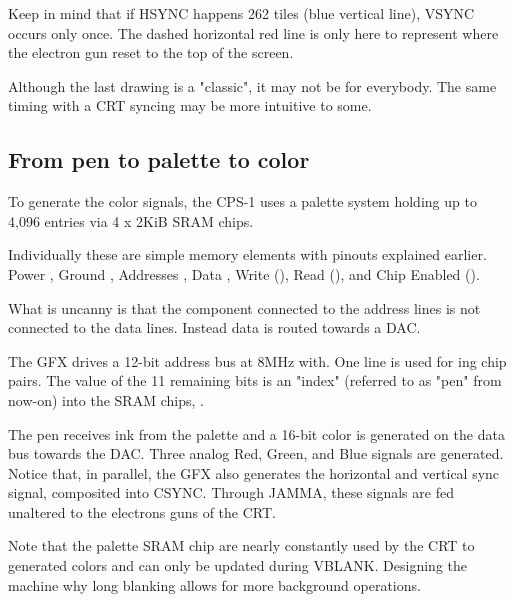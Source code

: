 
Keep in mind that if HSYNC happens 262 tiles (blue vertical line), VSYNC occurs only once. The dashed horizontal red line is only here to represent where the electron gun reset to the top of the screen.

Although the last drawing is a "classic", it may not be for everybody. The same timing with a CRT syncing may be more intuitive to some.


\subsection{From pen to palette to color}

To generate the color signals, the CPS-1 uses a palette system holding up to 4,096 entries via 4 x 2KiB  SRAM chips.


Individually these are simple memory elements with pinouts explained earlier. Power , Ground , Addresses , Data , Write (), Read (), and Chip Enabled ().

What is uncanny is that the component connected to the address lines is not connected to the data lines. Instead data is routed towards a DAC.







 The GFX drives a 12-bit address bus at 8MHz with. One line is used for ing chip pairs. The value of the 11 remaining bits is an "index" (referred to as "pen" from now-on) into the SRAM chips, . 

 The pen receives ink from the palette and a 16-bit color is generated on the data bus towards the DAC. Three analog Red, Green, and Blue signals are generated. Notice that, in parallel, the GFX also generates the horizontal and vertical sync signal, composited into CSYNC. Through JAMMA, these signals are fed unaltered to the electrons guns of the CRT.

 Note that the palette SRAM chip are nearly constantly used by the CRT to generated colors and can only be updated during VBLANK. Designing the machine why long blanking allows for more background operations. 



 

